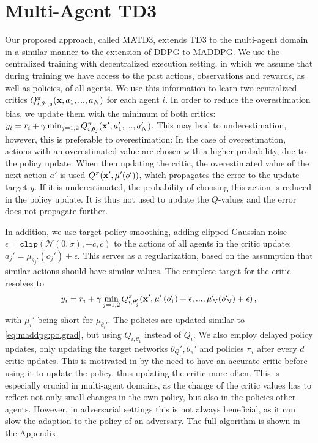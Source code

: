 \documentclass{article}
\renewcommand{\vec}[1]{\mathbf{\MakeLowercase{#1}}}
\newcommand{\policy}{\pi}
\newcommand{\detpol}{\mu}
\newcommand{\param}{\theta}
\newcommand{\reward}{r}
\newcommand{\action}{a}
\newcommand{\fullobservation}{\vec{x}}
\newcommand{\observation}{o}
\begin{document}
\section{Multi-Agent TD3}
\label{sec:approach}
Our proposed approach, called \gls*{MATD3}, extends TD3 to the multi-agent domain in a similar manner to the extension of \gls*{DDPG} to \gls*{MADDPG}.
We use the centralized training with decentralized execution setting, in which we assume that during training we have access to the past actions, observations and rewards, as well as policies, of all agents.
We use this information to learn two centralized critics $Q^\policy_{i,\param_{1,2}}(\fullobservation, \action_1,...,\action_N)$ for each agent $i$.
In order to reduce the overestimation bias, we update them with the minimum of both critics: $y_i = \reward_i + \gamma \min_{j=1,2}Q^\policy_{i,\param_{j}}(\fullobservation',\action_1',...,\action_N')$.
This may lead to underestimation, however, this is preferable to overestimation:
In the case of overestimation, actions with an overestimated value are chosen with a higher probability, due to the policy update.
When then updating the critic, the overestimated value of the next action $\action'$ is used $Q^\policy(\fullobservation', \detpol'(\observation'))$, which propagates the error to the update target $y$.
If it is underestimated, the probability of choosing this action is reduced in the policy update. 
It is thus not used to update the $Q$-values and the error does not propagate further.

In addition, we use target policy smoothing, adding clipped Gaussian noise $\epsilon = \mathtt{clip} (\mathcal{N}(0,\sigma),-c,c)$ to the actions of all agents in the critic update: $\action_j' = \detpol_{\param_j'}(\observation_j') + \epsilon$.
This serves as a regularization, based on the assumption that similar actions should have similar values.
The complete target for the critic resolves to
\begin{equation}
y_i = \reward_i + \gamma \min_{j=1,2} Q^\policy_{i,\param_j'}(\fullobservation',\detpol'_1(\observation_1') + \epsilon,...,\detpol'_N(\observation_N') + \epsilon) \,,
\end{equation}
with $\detpol_i'$ being short for $\detpol_{\param_i'}$.
The policies are updated similar to \eqref{eq:maddpg:polgrad}, but using $Q_{i,\param_1}$ instead of $Q_i$.
We also employ delayed policy updates, only updating the target networks $\param_Q', \param_\policy'$ and policies $\pi_i$ after every $d$ critic updates.
This is motivated in \cite{Fujimoto2018} by the need to have an accurate critic before using it to update the policy, thus updating the critic more often.
This is especially crucial in multi-agent domains, as the change of the critic values has to reflect not only small changes in the own policy, but also in the policies other agents.
However, in adversarial settings this is not always beneficial, as it can slow the adaption to the policy of an adversary.
The full algorithm is shown in the Appendix.
\end{document}
